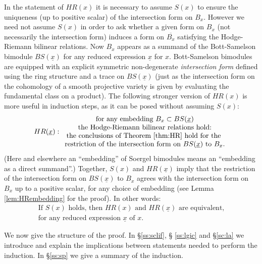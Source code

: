 \documentclass[11pt]{amsart}
\numberwithin{equation}{section}
\def\un{\underline}
\theoremstyle{definition}
\theoremstyle{remark}
\begin{document}
In the statement of $HR(x)$ it is necessary to assume $S(x)$ to ensure the
uniqueness (up to positive scalar) of the intersection form on $B_x$. 
However we need not assume $S(x)$ in order to ask
whether a given form on $B_x$ (not necessarily the intersection form)
induces a form on $\overline{B_x}$ satisfying the Hodge-Riemann
bilinear relations. Now $B_x$ appears as a summand of the
Bott-Samelson  
bimodule $BS(\un{x})$ for any reduced expression $\un{x}$ for $x$. 
Bott-Samelson bimodules are equipped with an explicit symmetric non-degenerate
\emph{intersection form} defined using the ring
structure and a trace on $BS(\un{x})$ (just as the
intersection form on the cohomology of a smooth projective variety is
given by evaluating the fundamental class on a product). The following
stronger version of $HR(x)$ is more useful in induction
steps, as it can be posed without assuming $S(x)$:
\begin{gather*}
HR(\un{x}): \begin{array}{c} \text{for any
    embedding $B_x \subset
    BS(\un{x})$} \\
\text{the Hodge-Riemann bilinear
      relations hold:}\\\text{the conclusions of Theorem \ref{thm:HR}
      hold for the } \\
\text{restriction of the intersection form on
      $BS(\un{x})$ to $B_x$.} \end{array}
\end{gather*}
(Here and elsewhere an ``embedding'' of Soergel
bimodules means an ``embedding as a direct summand''.)
Together, $S(x)$ and $HR(\un{x})$ imply that the restriction of the
intersection form on $BS(\un{x})$ to $B_x$ agrees with the intersection
form on $B_x$ up to a positive scalar, for any choice of embedding
(see Lemma \ref{lem:HRembedding} for the proof). In other words:
\begin{equation}
  \label{eq:1}\begin{matrix}
  \text{If $S(x)$ holds, then $HR(x)$ and $HR(\un{x})$ are equivalent,}\\
 \text{for any reduced expression $\un{x}$ of $x$.}
\end{matrix}
\end{equation}


We now give the structure of the proof. In \S \ref{ss:sclif}, \S
\ref{ss:lgic} and \S \ref{sc:la} we introduce and explain the
implications between statements needed to perform the induction. In \S\ref{ss:sp} we
give a summary of the induction.
\end{document}
